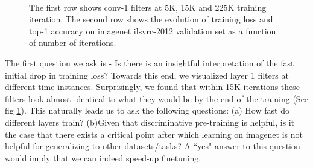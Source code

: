 \documentclass[runningheads]{llncs}
\begin{document}
\begin{figure}[t!]
 \\
\caption{The first row shows conv-1 filters at 5K, 15K and 225K training iteration. The second row shows the evolution of training loss and top-1 accuracy on imagenet ilsvrc-2012 validation set as a function of number of iterations.}
\label{fig:conv1}
\end{figure}

The first question we ask is - Is there is an insightful interpretation of the fast initial drop in training loss? Towards this end, we visualized layer 1 filters at different time instances. Surprisingly, we found that within 15K iterations these filters look almost identical to what they would be by the end of the training (See fig \ref{fig:conv1}). This naturally leads us to ask the following questions: (a) How fast do different layers train? (b)Given that discriminative pre-training is helpful, is it the case that there exists a critical point after which learning on imagenet is not helpful for generalizing to other datasets/tasks? A ``yes" answer to this question would imply that we can indeed speed-up finetuning.
\end{document}
